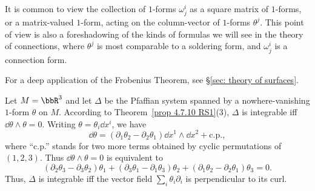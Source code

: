 \begin{rem}
    It is common to view the collection of $1$-forms $\omega^i_j$ as a square matrix of $1$-forms, or a matrix-valued $1$-form, acting on the column-vector of $1$-forms $\theta^j$. This point of view is also a foreshadowing of the kinds of formulas we will see in the theory of connections, where $\theta^j$ is most comparable to a soldering form, and $\omega^i_j$ is a connection form.
\end{rem}

For a deep application of the Frobenius Theorem, see \S\ref{sec: theory of surfaces}.

\begin{example}
    Let $M=\bbR^3$ and let $\Delta$ be the Pfaffian system spanned by a nowhere-vanishing $1$-form $\theta$ on $M$. According to Theorem~\ref{prop 4.7.10 RS1}(3), $\Delta$ is integrable iff $\dd\theta\wedge\theta=0$. Writing $\theta=\theta_i\dd x^i$, we have
    \[\dd\theta=(\partial_1\theta_2-\partial_2\theta_1)\dd x^1\wedge\dd x^2+\mathrm{c.p.},\]
    where ``c.p.'' stands for two more terms obtained by cyclic permutations of $(1,2,3)$. Thus $\dd\theta\wedge\theta=0$ is equivalent to
    \[(\partial_2\theta_3-\partial_3\theta_2)\theta_1+(\partial_3\theta_1-\partial_1\theta_3)\theta_2+(\partial_1\theta_2-\partial_2\theta_1)\theta_3=0.\]
    Thus, $\Delta$ is integrable iff the vector field $\sum_i \theta_i\partial_i$ is perpendicular to its curl.
\end{example}


